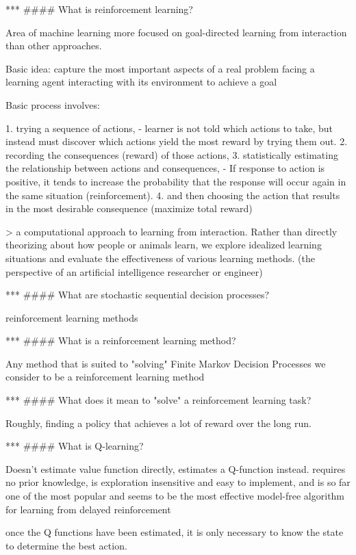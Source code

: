 \documentclass[10pt]{article}
\begin{document}
 
***
#### What is reinforcement learning?

Area of machine learning more focused on goal-directed learning from interaction than other approaches.

Basic idea: capture the most important aspects of a real problem facing a learning agent interacting with its environment to achieve a goal

Basic process involves: 

1. trying a sequence of actions, 
    - learner is not told which actions to take, but instead must discover which actions yield the most reward by trying them out.
2. recording the consequences (reward) of those actions,
3. statistically estimating the relationship between actions and consequences,
    - If response to action is positive, it tends to increase the probability that the response will occur again in the same situation (reinforcement).
4. and then choosing the action that results in the most desirable consequence (maximize total reward)

> a computational approach to learning from interaction. Rather than directly theorizing about how people or animals learn, we explore idealized learning situations and evaluate the effectiveness of various learning methods. (the perspective of an artificial intelligence researcher or engineer)


***
#### What are stochastic sequential decision processes?

reinforcement learning methods

***
#### What is a reinforcement learning method?

Any method that is suited to "solving" Finite Markov Decision Processes we consider to be a reinforcement learning method

***
#### What does it mean to "solve" a reinforcement learning task?

Roughly, finding a policy that achieves a lot of reward over the long run.

***
#### What is Q-learning?

Doesn't estimate value function directly, estimates a Q-function instead.
requires no prior knowledge, is exploration insensitive and easy to implement, and is so far one of the most popular and seems to be the most effective model-free algorithm for learning from delayed reinforcement

once the Q functions have been estimated, it is only necessary to know the state to determine the best action.
\end{document}
